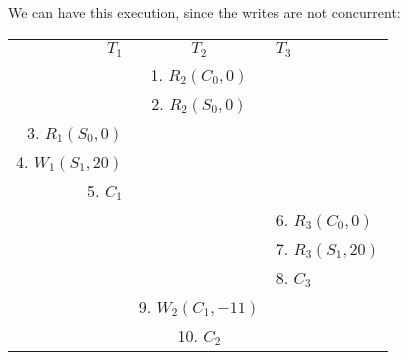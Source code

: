 We can have this execution, since the writes are not concurrent:

\begin{table}[H]
  \centering
  \begin{tabular}{ r | c | l }
    $T_1$ & $T_2$ & $T_3$ \\
    & 1. $R_2(C_0,0)$ & \\
    & 2. $R_2(S_0,0)$ & \\
    3. $R_1(S_0,0)$ & & \\
    4. $W_1(S_1,20)$ & & \\
    5. $C_1$ & & \\
    & & 6. $R_3(C_0,0)$ \\
    & & 7. $R_3(S_1,20)$ \\
    & & 8. $C_3$\\
    & 9. $W_2(C_1,-11)$ & \\
    & 10. $C_2$ & \\
  \end{tabular}
\end{table}
